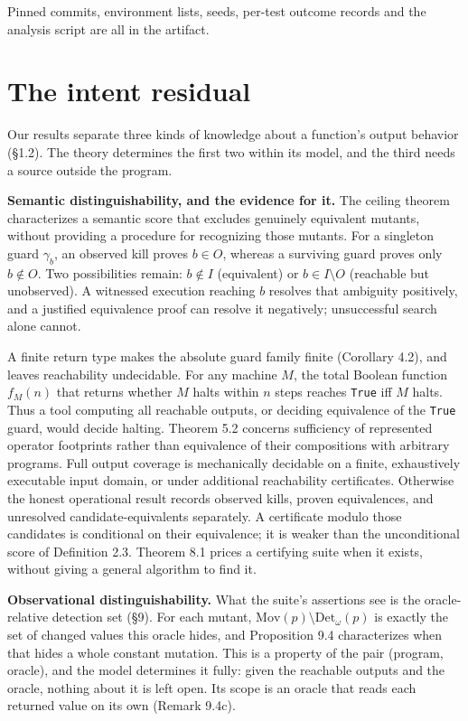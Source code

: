 \documentclass[conference]{IEEEtran}
\newcommand{\Mov}{\mathrm{Mov}}
\newcommand{\Det}{\mathrm{Det}}
\theoremstyle{run}
\begin{document}
Pinned commits, environment lists, seeds, per-test outcome records and the analysis script are all in the artifact.

\setcounter{section}{9}
\section{The intent residual}
Our results separate three kinds of knowledge about a function's output behavior (\S 1.2). The theory determines the first two within its model, and the third needs a source outside the program.

\textbf{Semantic distinguishability, and the evidence for it.} The ceiling theorem characterizes a semantic score that excludes genuinely equivalent mutants, without providing a procedure for recognizing those mutants. For a singleton guard $\gamma_b$, an observed kill proves $b\in O$, whereas a surviving guard proves only $b\notin O$. Two possibilities remain: $b\notin I$ (equivalent) or $b\in I\setminus O$ (reachable but unobserved). A witnessed execution reaching $b$ resolves that ambiguity positively, and a justified equivalence proof can resolve it negatively; unsuccessful search alone cannot.

A finite return type makes the absolute guard family finite (Corollary 4.2), and leaves reachability undecidable. For any machine $M$, the total Boolean function $f_M(n)$ that returns whether $M$ halts within $n$ steps reaches \texttt{True} iff $M$ halts. Thus a tool computing all reachable outputs, or deciding equivalence of the \texttt{True} guard, would decide halting. Theorem 5.2 concerns sufficiency of represented operator footprints rather than equivalence of their compositions with arbitrary programs. Full output coverage is mechanically decidable on a finite, exhaustively executable input domain, or under additional reachability certificates. Otherwise the honest operational result records observed kills, proven equivalences, and unresolved candidate-equivalents separately. A certificate modulo those candidates is conditional on their equivalence; it is weaker than the unconditional score of Definition 2.3. Theorem 8.1 prices a certifying suite when it exists, without giving a general algorithm to find it.

\textbf{Observational distinguishability.} What the suite's assertions see is the oracle-relative detection set (\S 9). For each mutant, $\Mov(p) \setminus \Det_\omega(p)$ is exactly the set of changed values this oracle hides, and Proposition 9.4 characterizes when that hides a whole constant mutation. This is a property of the pair (program, oracle), and the model determines it fully: given the reachable outputs and the oracle, nothing about it is left open. Its scope is an oracle that reads each returned value on its own (Remark 9.4c).
\end{document}
